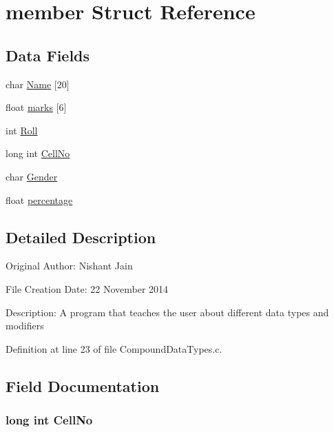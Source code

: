 \hypertarget{structmember}{\section{member Struct Reference}
\label{structmember}
}
\subsection*{Data Fields}
\begin{DoxyCompactItemize}
\item 
char \hyperlink{structmember_a2053e4d21d9f2f5158910a2977224749}{Name} \mbox{[}20\mbox{]}
\item 
float \hyperlink{structmember_ad4c3e5c25307fd49af034db07064803a}{marks} \mbox{[}6\mbox{]}
\item 
int \hyperlink{structmember_abf08303c7c1c86949317530985b66f65}{Roll}
\item 
long int \hyperlink{structmember_ab06b37fd487ea9df9d12601461704dc2}{Cell\+No}
\item 
char \hyperlink{structmember_afbcfc79081bb5d32e3e787e11b880fda}{Gender}
\item 
float \hyperlink{structmember_a34c5b668208550b3c34a2ed0eec615f5}{percentage}
\end{DoxyCompactItemize}


\subsection{Detailed Description}




Original Author\+: Nishant Jain

File Creation Date\+: 22 November 2014

Description\+: A program that teaches the user about different data types and modifiers 

Definition at line 23 of file Compound\+Data\+Types.\+c.



\subsection{Field Documentation}
\hypertarget{structmember_ab06b37fd487ea9df9d12601461704dc2}{
\subsubsection[{Cell\+No}]{\setlength{\rightskip}{0pt plus 5cm}long int Cell\+No}}\label{structmember_ab06b37fd487ea9df9d12601461704dc2}


